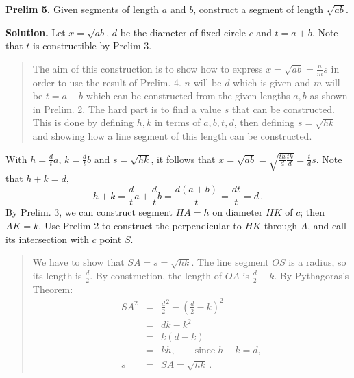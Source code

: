 \textbf{Prelim 5.} Given segments of length $a$ and $b$, construct a segment of length $\sqrt{ab}$.

\textbf{Solution.} Let $x=\sqrt{ab}$, $d$ be the diameter of fixed circle $c$ and $t=a+b$. Note that $t$ is constructible by Prelim 3.
\begin{quote}
\vspace*{-8pt}
The aim of this construction is to show how to express $x=\sqrt{ab}=\frac{n}{m}s$ in order to use the result of Prelim. 4. $n$ will be $d$ which is given and $m$ will be $t=a+b$ which can be constructed from the given lengths $a,b$ as shown in Prelim. 2. The hard part is to find a value $s$ that can be constructed. This is done by defining $h,k$ in terms of $a,b,t,d$, then defining $s=\sqrt{hk}$ and showing how a line segment of this length can be constructed.
\vspace*{-8pt}
\end{quote}
With  $h=\frac{d}{t}a$, $k=\frac{d}{t}b$ and $s=\sqrt{hk}$, it follows that $x=\sqrt{ab}=\sqrt{\frac{th}{d}\frac{tk}{d}}=\frac{t}{d}s$. Note that $h+k=d$,
\[
h+k = \frac{d}{t}a + \frac{d}{t}b = \frac{d(a+b)}{t} = \frac{dt}{t} = d\,.
\]
By Prelim. 3, we can construct segment $HA= h$ on diameter $HK$ of $c$; then $AK=k$. Use Prelim 2 to construct the perpendicular to $HK$ through $A$, and call its intersection with $c$ point $S$. 
\begin{center}
\vspace*{-8pt}
\vspace*{-8pt}
\end{center}
\begin{quote}
We have to show that $SA=s=\sqrt{hk}$. The line segment $OS$ is a radius, so its length is $\frac{d}{2}$. By construction, the length of $OA$ is $\frac{d}{2}-k$. By Pythagoras's Theorem:
\[
\renewcommand*{\arraystretch}{1.5}
\begin{array}{rcl}
SA^2 &=& \frac{d}{2}^2 - (\frac{d}{2}-k)^2\\
&=& dk - k^2\\
&=& k(d-k)\\
&=& kh,\quad\quad \textrm{since}\; h+k=d,\\
s&=&SA=\sqrt{hk}\,.
\end{array}
\]
\end{quote}

